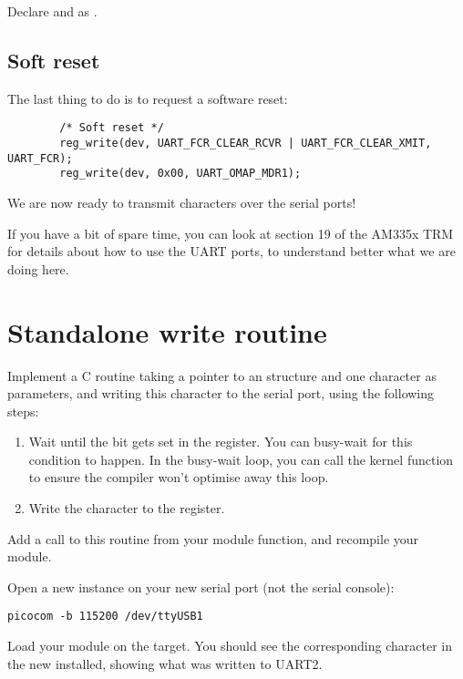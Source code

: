 Declare  and  as .

\subsection{Soft reset}

The last thing to do is to request a software reset:

\begin{verbatim}
        /* Soft reset */
        reg_write(dev, UART_FCR_CLEAR_RCVR | UART_FCR_CLEAR_XMIT, UART_FCR);
        reg_write(dev, 0x00, UART_OMAP_MDR1);
\end{verbatim}

We are now ready to transmit characters over the serial ports!

If you have a bit of spare time, you can look at section 19 of the
AM335x TRM for details about how to use the UART ports, to understand
better what we are doing here.
 
\section{Standalone write routine}

Implement a C routine taking a pointer to an 
structure and one character as parameters, and writing
this character to the serial port, using the following steps:

\begin{enumerate}
\item Wait until the  bit gets set in the
   register.  You can busy-wait for this condition to happen.
  In the busy-wait loop, you can call the  kernel function
  to ensure the compiler won't optimise away this loop.
\item Write the character to the  register.
\end{enumerate}

Add a call to this routine from your module  function,
and recompile your module.

Open a new  instance on your new serial port (not the
serial console):

\begin{verbatim}
picocom -b 115200 /dev/ttyUSB1
\end{verbatim}

Load your module on the target. You should see the
corresponding character in the new  installed,
showing what was written to UART2.

